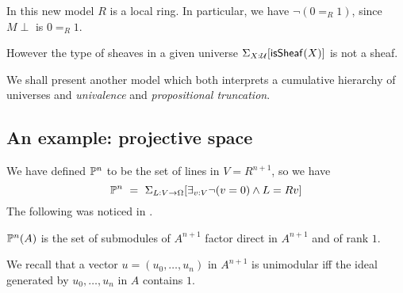     


    In this new model $R$ is a local ring.
    In particular, we have $\neg (0 =_R 1)$, since $M\perp$ is $0 =_R 1$.
    
    \medskip

    However the type of sheaves in a given universe $\Sigma_{X:\mathcal{U}}[\mathsf{isSheaf}(X)]$ is not a sheaf.

    We shall present another model which both interprets a cumulative hierarchy of universes
    and {\em univalence} and {\em propositional truncation}.

\subsection{An example: projective space}    

We have defined $\mathbb{P}^n$ to be the set of lines in $V = R^{n+1}$, so we have
$$
\mathbb{P}^n ~=~ \Sigma_{L:V\rightarrow \Omega}[\exists_{v:V}\neg (v = 0)\wedge L = R v]
$$
The following was noticed in \cite{kockreyes}.

\begin{proposition}
  $\mathbb{P}^n(A)$ is the set of submodules of $A^{n+1}$ factor direct in $A^{n+1}$ and of rank $1$.
\end{proposition}

We recall \cite{lombardi-quitte}
that a vector $u = (u_0,\dots,u_n)$ in $A^{n+1}$ is unimodular iff the ideal generated by $u_0,\dots,u_n$ in $A$ contains $1$.

